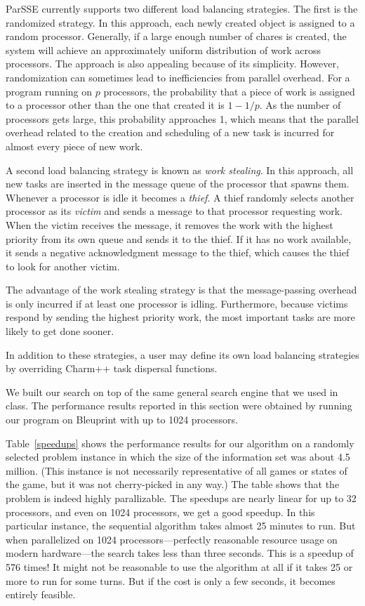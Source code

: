 \documentclass[times, 10pt,twocolumn]{article}
\begin{document}
{\sc ParSSE} currently supports two different load balancing strategies.  The
first is the randomized strategy.  In this approach, each newly created object
is assigned to a random processor.  Generally, if a large enough number of 
chares is created, the system will achieve an approximately uniform
distribution of work across processors.  The approach is also appealing because
of its simplicity. However, randomization can sometimes lead to inefficiencies
from parallel overhead.  For a program running on $p$ processors, the
probability that a piece of work is assigned to a processor other than the
one that created it is $1-1/p$.  As the number of processors gets large, this
probability approaches 1, which means that the parallel overhead related to the
creation and scheduling of a new task is incurred for almost every piece of new
work.
 
A second load balancing strategy is known as {\em work stealing}.  In this
approach, all new tasks are inserted in the message queue of the processor that
spawns them.  Whenever a processor is idle it becomes a {\em thief}.  A thief
randomly selects another processor as its {\em victim} and sends a message to
that processor requesting work.  When the victim receives the message, it
removes the work with the highest priority from its own queue and sends it to
the thief.  If it has no work available, it sends a negative acknowledgment
message to the thief, which causes the thief to look for another victim.

The advantage of the work stealing strategy is that the message-passing
overhead is only incurred if at least one processor is idling.  Furthermore,
because victims respond by sending the highest priority work, the most
important tasks are more likely to get done sooner.  

In addition to these strategies, a user may define its own load balancing
strategies by overriding {\sc Charm++} task dispersal functions.

We built our search on top of the same general search engine that we used in class.  The performance results reported in
this section were obtained by running our program on Bleuprint with up to 1024 processors.

Table~\ref{speedups} shows the performance results for our algorithm on a randomly selected problem instance in which
the size of the information set was about 4.5 million.  (This instance is not necessarily representative of all games or
states of the game, but it was not cherry-picked in any way.)  The table shows that the problem is indeed highly
parallizable.  The speedups are nearly linear for up  to 32 processors, and even on 1024 processors, we get a good
speedup.  In this particular instance, the sequential algorithm takes almost 25 minutes to run.  But when parallelized
on 1024 processors---perfectly reasonable resource usage on modern hardware---the search takes less than three seconds.
This is a speedup of 576 times!  It might not be reasonable to use the algorithm at all if it takes 25 or more to run
for some turns.  But if the cost is only a few seconds, it becomes entirely feasible.
\end{document}
